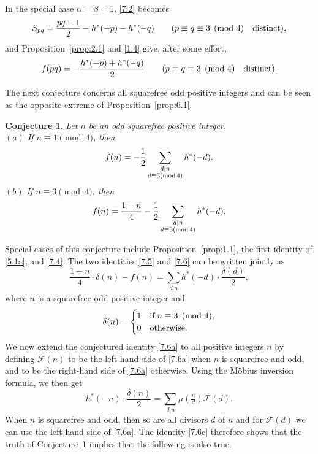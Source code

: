 \documentclass{amsart}
\theoremstyle{plain}
\newtheorem{conjecture}[theorem]{Conjecture}
\numberwithin{equation}{section}
\begin{document}
In the special case $\alpha=\beta=1$, \eqref{7.2} becomes
\begin{equation}\label{7.3}
S_{pq} = \frac{pq-1}{2} - h^*(-p) - h^*(-q)
\qquad(p\equiv q\equiv 3\pmod{4}\quad\hbox{distinct}),
\end{equation}
and Proposition~\ref{prop:2.1} and \eqref{1.4} give, after some effort,
\begin{equation}\label{7.4}
f(pq) = -\frac{h^*(-p)+h^*(-q)}{2}
\qquad(p\equiv q\equiv 3\pmod{4}\quad\hbox{distinct}).
\end{equation}

The next conjecture concerns all squarefree odd positive integers and can be
seen as the opposite extreme of Proposition~\ref{prop:6.1}.

\begin{conjecture}\label{conj:7.3}
Let $n$ be an odd squarefree positive integer.\\
$(a)$ If $n\equiv 1\pmod{4}$, then
\begin{equation}\label{7.5}
f(n) = -\frac{1}{2}\sum_{\substack{d|n\\d\equiv 3 (\rm{mod}\,4)}}h^*(-d).
\end{equation}
$(b)$ If $n\equiv 3\pmod{4}$, then
\begin{equation}\label{7.6}
f(n) = \frac{1-n}{4} 
-\frac{1}{2}\sum_{\substack{d|n\\d\equiv 3 (\rm{mod}\,4)}}h^*(-d).
\end{equation}
\end{conjecture}
Special cases of this conjecture include Proposition~\ref{prop:1.1}, the first 
identity of \eqref{5.1a}, and \eqref{7.4}.
The two identities \eqref{7.5} and \eqref{7.6} can be written jointly as
\begin{equation}\label{7.6a}
\frac{1-n}{4}\cdot\delta(n)-f(n)=\sum_{d|n}h^*(-d)\cdot\frac{\delta(d)}{2},
\end{equation}
where $n$ is a squarefree odd positive integer and
\begin{equation}\label{7.6b}
\delta(n)=\begin{cases}
1 & \hbox{if}\;n\equiv 3\pmod{4},\\
0 & \hbox{otherwise}.
\end{cases}
\end{equation}
We now extend the conjectured identity \eqref{7.6a} to all positive integers
$n$ by defining $\mathcal{F}(n)$ to be the left-hand side of \eqref{7.6a} when
$n$ is squarefree and odd, and to be the right-hand side of \eqref{7.6a} 
otherwise. Using the M\"obius inversion formula, we then get
\begin{equation}\label{7.6c}
h^*(-n)\cdot\frac{\delta(n)}{2}
=\sum_{d|n}\mu(\tfrac{n}{d})\mathcal{F}(d).
\end{equation}
When $n$ is squarefree and odd, then so are all divisors $d$ of $n$ 
and for $\mathcal{F}(d)$ we can
use the left-hand side of \eqref{7.6a}. The identity \eqref{7.6c} therefore
shows that the truth of Conjecture~\ref{conj:7.3} implies that the following
is also true.
\end{document}
